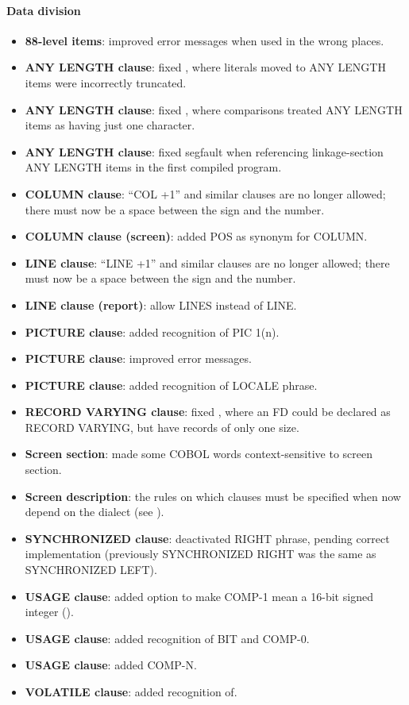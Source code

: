 \paragraph{Data division}
\begin{itemize}
\item \textbf{88-level items}: improved error messages when used in the wrong places.
\item \textbf{ANY LENGTH clause}: fixed , where literals moved to ANY LENGTH items were incorrectly truncated.
\item \textbf{ANY LENGTH clause}: fixed , where comparisons treated ANY LENGTH items as having just one character.
\item \textbf{ANY LENGTH clause}: fixed segfault when referencing linkage-section ANY LENGTH items in the first compiled program.
\item \textbf{COLUMN clause}: ``COL +1'' and similar clauses are no longer allowed; there must now be a space between the sign and the number.
\item \textbf{COLUMN clause (screen)}: added POS as synonym for COLUMN.
\item \textbf{LINE clause}: ``LINE +1'' and similar clauses are no longer allowed; there must now be a space between the sign and the number.
\item \textbf{LINE clause (report)}: allow LINES instead of LINE.
\item \textbf{PICTURE clause}: added recognition of PIC 1(n).
\item \textbf{PICTURE clause}: improved error messages.
\item \textbf{PICTURE clause}: added recognition of LOCALE phrase.
\item \textbf{RECORD VARYING clause}: fixed , where an FD could be declared as RECORD VARYING, but have records of only one size.
\item \textbf{Screen section}: made some COBOL words context-sensitive to screen section.
\item \textbf{Screen description}: the rules on which clauses must be specified when now depend on the dialect (see ).
\item \textbf{SYNCHRONIZED clause}: deactivated RIGHT phrase, pending correct implementation (previously SYNCHRONIZED RIGHT was the same as SYNCHRONIZED LEFT).
\item \textbf{USAGE clause}: added option to make COMP-1 mean a 16-bit signed integer ().
\item \textbf{USAGE clause}: added recognition of BIT and COMP-0.
\item \textbf{USAGE clause}: added COMP-N.
\item \textbf{VOLATILE clause}: added recognition of.
\end{itemize}

